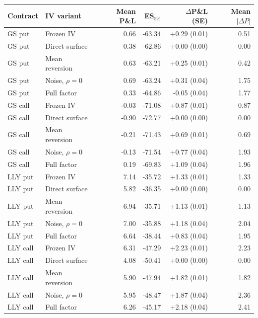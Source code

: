 \begin{tabular}{llrrrr}
\toprule
Contract & IV variant & Mean P\&L & ES$_{5\%}$ & $\Delta$P\&L (SE) & Mean $|\Delta P|$ \\
\midrule
GS put & Frozen IV & 0.66 & -63.34 & +0.29 (0.01) & 0.51 \\
GS put & Direct surface & 0.38 & -62.86 & +0.00 (0.00) & 0.00 \\
GS put & Mean reversion & 0.63 & -63.21 & +0.25 (0.01) & 0.42 \\
GS put & Noise, $\rho=0$ & 0.69 & -63.24 & +0.31 (0.04) & 1.75 \\
GS put & Full factor & 0.33 & -64.86 & -0.05 (0.04) & 1.77 \\
\midrule
GS call & Frozen IV & -0.03 & -71.08 & +0.87 (0.01) & 0.87 \\
GS call & Direct surface & -0.90 & -72.77 & +0.00 (0.00) & 0.00 \\
GS call & Mean reversion & -0.21 & -71.43 & +0.69 (0.01) & 0.69 \\
GS call & Noise, $\rho=0$ & -0.13 & -71.54 & +0.77 (0.04) & 1.93 \\
GS call & Full factor & 0.19 & -69.83 & +1.09 (0.04) & 1.96 \\
\midrule
LLY put & Frozen IV & 7.14 & -35.72 & +1.33 (0.01) & 1.33 \\
LLY put & Direct surface & 5.82 & -36.35 & +0.00 (0.00) & 0.00 \\
LLY put & Mean reversion & 6.94 & -35.71 & +1.13 (0.01) & 1.13 \\
LLY put & Noise, $\rho=0$ & 7.00 & -35.88 & +1.18 (0.04) & 2.04 \\
LLY put & Full factor & 6.64 & -38.44 & +0.83 (0.04) & 1.95 \\
\midrule
LLY call & Frozen IV & 6.31 & -47.29 & +2.23 (0.01) & 2.23 \\
LLY call & Direct surface & 4.08 & -50.41 & +0.00 (0.00) & 0.00 \\
LLY call & Mean reversion & 5.90 & -47.94 & +1.82 (0.01) & 1.82 \\
LLY call & Noise, $\rho=0$ & 5.95 & -48.47 & +1.87 (0.04) & 2.36 \\
LLY call & Full factor & 6.26 & -45.17 & +2.18 (0.04) & 2.41 \\
\midrule
\end{tabular}
